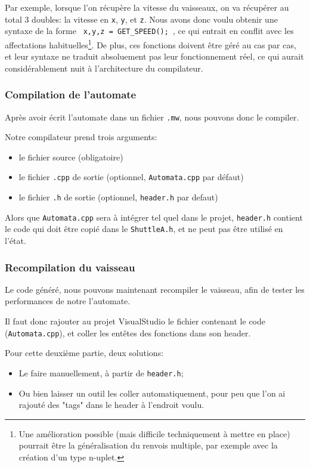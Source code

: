 \documentclass[a4paper,11pt]{article}
\begin{document}
        Par exemple, lorsque l'on récupère la vitesse du vaisseaux, on va récupérer au total 3 doubles: la vitesse en \verb|x|, \verb|y|, et \verb|z|. Nous avons donc voulu obtenir une syntaxe de la forme \verb| x,y,z = GET_SPEED(); |, ce qui entrait en conflit avec les affectations habituelles\footnote{Une amélioration possible (mais difficile techniquement à mettre en place) pourrait être la généralisation du renvois multiple, par exemple avec la création d'un type n-uplet.}. De plus, ces fonctions doivent être géré au cas par cas, et leur syntaxe ne traduit absoluement pas leur fonctionnement réel, ce qui aurait considérablement nuit à l'architecture du compilateur.
        
        \subsubsection{Compilation de l'automate}
            Après avoir écrit l'automate dans un fichier \texttt{.mw}, nous pouvons donc le compiler.
            
            Notre compilateur prend trois arguments:
            \begin{itemize}
                \item le fichier source (obligatoire)
                \item le fichier \verb|.cpp| de sortie (optionnel, \texttt{Automata.cpp} par défaut)
                \item le fichier \verb|.h| de sortie (optionnel, \texttt{header.h} par defaut)
            \end{itemize}
            
            Alors que \texttt{Automata.cpp} sera à intégrer tel quel dans le projet, \texttt{header.h} contient le code qui doit être copié dans le \texttt{ShuttleA.h}, et ne peut pas être utilisé en l'état.

        \subsubsection{Recompilation du vaisseau}
            \label{header_tag}
            Le code généré, nous pouvons maintenant recompiler le vaisseau, afin de tester les performances de notre l'automate.
            
            Il faut donc rajouter au projet VisualStudio le fichier contenant le code (\texttt{Automata.cpp}), et coller les entêtes des fonctions dans son header.
            
            Pour cette deuxième partie, deux solutions:
            \begin{itemize}
                \item Le faire manuellement, à partir de \texttt{header.h};
                \item Ou bien laisser un outil les coller automatiquement, pour peu que l'on ai rajouté des "tags" dans le header à l'endroit voulu. 
            \end{itemize}
            
\end{document}
